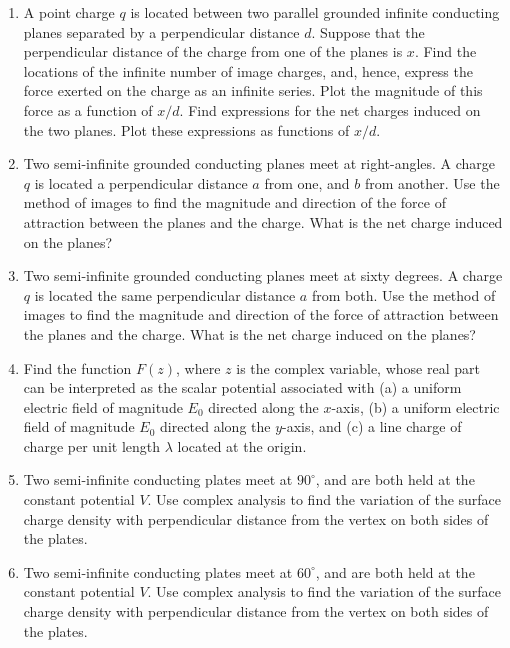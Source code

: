 {\begin{enumerate}
the cylinder's axis and the plane be $d$ (where $d>a$). What is the
force of attraction per unit length between the cylinder and the plane? 
What is the charge per unit length induced on the plane? Use the method of images.
\item A point charge $q$ is located between two parallel
grounded infinite conducting planes separated by a perpendicular distance $d$. Suppose that the perpendicular distance of the charge from one of
the planes is $x$. Find the locations of the infinite number of image charges, and, hence, express the force exerted on the charge as an infinite series.
Plot the magnitude of this force as a function of $x/d$. Find expressions
for the net charges induced on the two planes. Plot these expressions as
functions of $x/d$. 
\item Two semi-infinite grounded conducting planes meet at right-angles.
A charge $q$ is located a perpendicular distance $a$ from one, and
$b$ from another. Use the method of images to find the magnitude and direction of the
force of attraction between the planes and the charge. What is the
net charge induced on the planes?
\item Two semi-infinite grounded conducting planes meet at sixty degrees.
A charge $q$ is located the same perpendicular distance $a$ from both. Use the method of images to find the magnitude and direction of the
force of attraction between the planes and the charge. What is the
net charge induced on the planes?
\item Find the function $F(z)$, where $z$ is the complex variable,
whose real part can be interpreted as the scalar potential
associated with (a) a uniform electric field of magnitude $E_0$ directed
along the $x$-axis, (b) a uniform electric field of magnitude $E_0$
directed along the $y$-axis, and (c) a  line charge of charge per unit length
$\lambda$ located at the origin.
\item Two semi-infinite conducting plates  meet at $90^\circ$, and are both held
at the constant potential $V$.  Use complex analysis to find the  variation
of the surface charge density with  perpendicular distance
from the vertex on both sides of the plates.
\item Two semi-infinite conducting plates  meet at $60^\circ$, and are both held
at the constant potential $V$.  Use complex analysis to find the variation
of the surface charge density with perpendicular distance
from the vertex on both sides of the plates.


\end{enumerate}}
